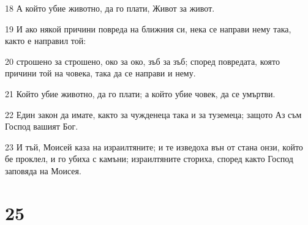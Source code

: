 \par 18 А който убие животно, да го плати, Живот за живот.
\par 19 И ако някой причини повреда на ближния си, нека се направи нему така, както е направил той:
\par 20 строшено за строшено, око за око, зъб за зъб; според повредата, която причини той на човека, така да се направи и нему.
\par 21 Който убие животно, да го плати; а който убие човек, да се умъртви.
\par 22 Един закон да имате, както за чужденеца така и за туземеца; защото Аз съм Господ вашият Бог.
\par 23 И тъй, Моисей каза на израилтяните; и те изведоха вън от стана онзи, който бе проклел, и го убиха с камъни; израилтяните сториха, според както Господ заповяда на Моисея.

\chapter{25}

